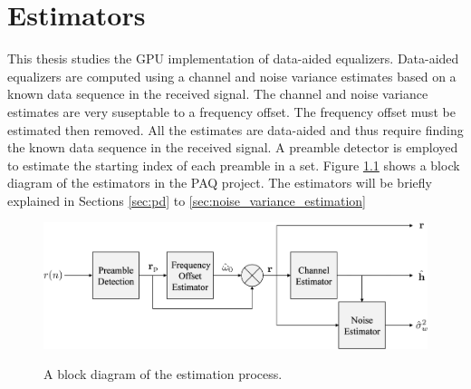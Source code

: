 

\chapter{Estimators}
\label{sec:estimators}
This thesis studies the GPU implementation of data-aided equalizers.
Data-aided equalizers are computed using a channel and noise variance estimates based on a known data sequence in the received signal.
The channel and noise variance estimates are very suseptable to a frequency offset.
The frequency offset must be estimated then removed.
All the estimates are data-aided and thus require finding the known data sequence in the received signal.
A preamble detector is employed to estimate the starting index of each preamble in a set.
Figure \ref{fig:estimatorBlock} shows a block diagram of the estimators in the PAQ project.
The estimators will be briefly explained in Sections \ref{sec:pd} to \ref{sec:noise_variance_estimation}
\begin{figure}
	\caption{A block diagram of the estimation process.}
	\centering\includegraphics[width=10.33in/100*55]{figures/systemOverview/estimatorBlock.pdf}
	\label{fig:estimatorBlock}
\end{figure}

